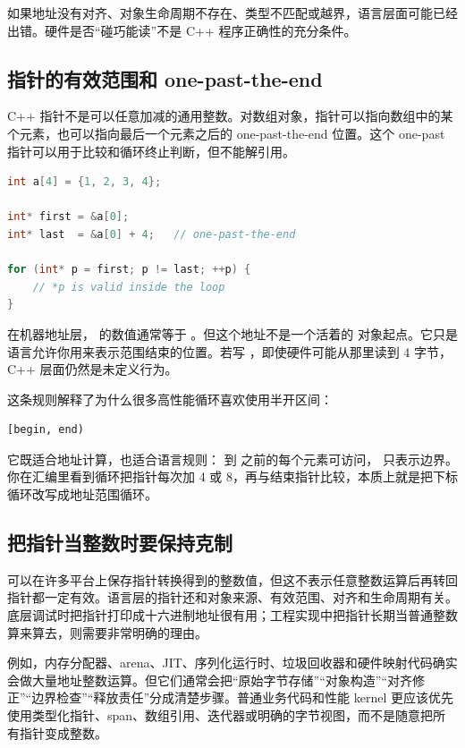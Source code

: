 如果地址没有对齐、对象生命周期不存在、类型不匹配或越界，语言层面可能已经出错。硬件是否“碰巧能读”不是 C++ 程序正确性的充分条件。

\subsection{指针的有效范围和 one-past-the-end}

C++ 指针不是可以任意加减的通用整数。对数组对象，指针可以指向数组中的某个元素，也可以指向最后一个元素之后的 one-past-the-end 位置。这个 one-past 指针可以用于比较和循环终止判断，但不能解引用。

\begin{lstlisting}[language=C++]
int a[4] = {1, 2, 3, 4};

int* first = &a[0];
int* last  = &a[0] + 4;   // one-past-the-end

for (int* p = first; p != last; ++p) {
    // *p is valid inside the loop
}
\end{lstlisting}

在机器地址层， 的数值通常等于 。但这个地址不是一个活着的  对象起点。它只是语言允许你用来表示范围结束的位置。若写 ，即使硬件可能从那里读到 4 字节，C++ 层面仍然是未定义行为。

这条规则解释了为什么很多高性能循环喜欢使用半开区间：

\begin{lstlisting}
[begin, end)
\end{lstlisting}

它既适合地址计算，也适合语言规则： 到  之前的每个元素可访问， 只表示边界。你在汇编里看到循环把指针每次加 4 或 8，再与结束指针比较，本质上就是把下标循环改写成地址范围循环。

\subsection{把指针当整数时要保持克制}

 可以在许多平台上保存指针转换得到的整数值，但这不表示任意整数运算后再转回指针都一定有效。语言层的指针还和对象来源、有效范围、对齐和生命周期有关。底层调试时把指针打印成十六进制地址很有用；工程实现中把指针长期当普通整数算来算去，则需要非常明确的理由。

例如，内存分配器、arena、JIT、序列化运行时、垃圾回收器和硬件映射代码确实会做大量地址整数运算。但它们通常会把“原始字节存储”“对象构造”“对齐修正”“边界检查”“释放责任”分成清楚步骤。普通业务代码和性能 kernel 更应该优先使用类型化指针、span、数组引用、迭代器或明确的字节视图，而不是随意把所有指针变成整数。

